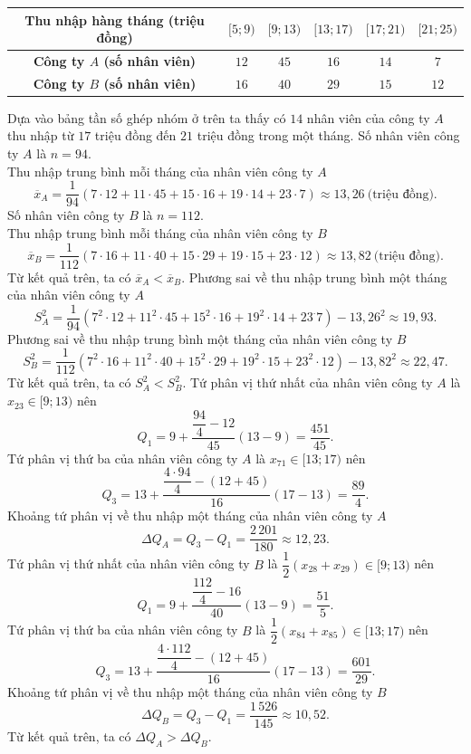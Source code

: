\begin{ex}
{\begin{longtable}{|c|c|c|c|c|c|}
\hline
\textbf{Thu nhập hàng tháng (triệu đồng)}&$[5;9)$&$[9;13)$&$[13;17)$&$[17;21)$&$[21;25)$\\
\hline
\textbf{Công ty $A$ (số nhân viên)}&$12$&$45$&$16$&$14$&$7$\\
\hline
\textbf{Công ty $B$ (số nhân viên)}&$16$&$40$&$29$&$15$&$12$\\
\hline
\end{longtable}\vspace{-5mm}
\begin{itemchoice}
\itemch Dựa vào bảng tần số ghép nhóm ở trên ta thấy có $14$ nhân viên của công ty $A$ thu nhập từ $17$ triệu đồng đến $21$ triệu đồng trong một tháng.
\itemch Số nhân viên công ty $A$ là $n=94$.\\
Thu nhập trung bình mỗi tháng của nhân viên công ty $A$
$$\overline{x}_A=\dfrac{1}{94}\left(7\cdot 12+11\cdot 45+15\cdot 16+19\cdot 14+23\cdot 7 \right)\approx13{,}26~\text{(triệu đồng).}$$
Số nhân viên công ty $B$ là $n=112$.\\
Thu nhập trung bình mỗi tháng của nhân viên công ty $B$
$$\overline{x}_B=\dfrac{1}{112}\left(7\cdot 16+11\cdot 40+15\cdot 29+19\cdot 15+23\cdot 12 \right)\approx 13{,}82~\text{(triệu đồng).}$$
Từ kết quả trên, ta có $\overline{x}_A<\overline{x}_B$.
\itemch 
Phương sai về thu nhập trung bình một tháng của nhân viên công ty $A$ $$S^2_A=\dfrac{1}{94}\left(7^2\cdot 12+11^2\cdot 45+15^2\cdot 16+19^2\cdot 14+23^\cdot 7 \right)-13{,}26^2\approx 19{,}93.$$
Phương sai về thu nhập trung bình một tháng của nhân viên công ty $B$ $$S^2_B=\dfrac{1}{112}\left(7^2\cdot 16+11^2\cdot 40+15^2\cdot 29+19^2\cdot 15+23^2\cdot 12 \right)-13{,}82^2\approx 22{,}47.$$
Từ kết quả trên, ta có $S^2_A<S^2_B$.
\itemch Tứ phân vị thứ nhất của nhân viên công ty $A$ là $x_{23}\in [9;13)$	nên $$Q_1=9+\dfrac{\dfrac{94}{4}-12}{45}(13-9)=\dfrac{451}{45}.$$
Tứ phân vị thứ ba của nhân viên công ty $A$ là $x_{71}\in [13;17)$	nên $$Q_3=13+\dfrac{\dfrac{4\cdot94}{4}-(12+45)}{16}(17-13)=\dfrac{89}{4}.$$
Khoảng tứ phân vị về thu nhập một tháng của nhân viên công ty $A$ $$\Delta Q_A=Q_3-Q_1=\dfrac{2\,201}{180}\approx 12{,}23.$$
Tứ phân vị thứ nhất của nhân viên công ty $B$ là $\dfrac{1}{2}\left( x_{28}+x_{29}\right) \in [9;13)$	nên $$Q_1=9+\dfrac{\dfrac{112}{4}-16}{40}(13-9)=\dfrac{51}{5}.$$
Tứ phân vị thứ ba của nhân viên công ty $B$ là $\dfrac{1}{2}\left( x_{84}+x_{85}\right) \in [13;17)$	nên $$Q_3=13+\dfrac{\dfrac{4\cdot112}{4}-(12+45)}{16}(17-13)=\dfrac{601}{29}.$$
Khoảng tứ phân vị về thu nhập một tháng của nhân viên công ty $B$ $$\Delta Q_B=Q_3-Q_1=\dfrac{1\,526}{145}\approx 10{,}52.$$	
Từ kết quả trên, ta có $\Delta Q_A>\Delta Q_B$.
\end{itemchoice}
}
\end{ex}

